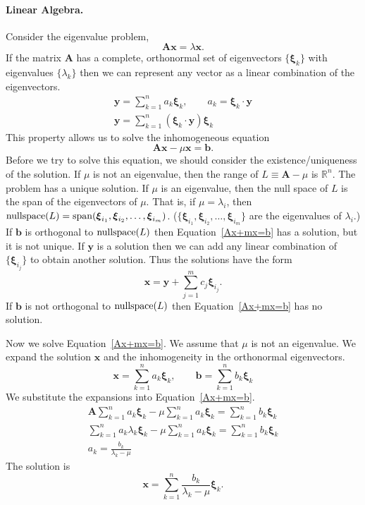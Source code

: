 \paragraph{Linear Algebra.}
Consider the eigenvalue problem,
\[
\mathbf{A} \mathbf{x} = \lambda \mathbf{x}.
\]
If the matrix $\mathbf{A}$ has a complete, orthonormal set of eigenvectors
$\{ \boldsymbol{\xi}_k \}$ with eigenvalues $\{ \lambda_k \}$ then we can
represent any vector as a linear combination of the eigenvectors.
\begin{gather*}
  \mathbf{y} = \sum_{k=1}^n a_k \boldsymbol{\xi}_k, \qquad
  a_k = \boldsymbol{\xi}_k \cdot \mathbf{y} \\
  \mathbf{y} = \sum_{k=1}^n \left(\boldsymbol{\xi}_k \cdot \mathbf{y} \right) \boldsymbol{\xi}_k
\end{gather*}
This property allows us to solve the inhomogeneous equation
\begin{equation}
  \label{Ax+mx=b}
  \mathbf{A} \mathbf{x} - \mu \mathbf{x} = \mathbf{b}.
\end{equation}
Before we try to solve this equation, we should consider the
existence/uniqueness of the solution.  If $\mu$ is not an eigenvalue,
then the range of $L \equiv \mathbf{A} - \mu$ is $\mathbb{R}^n$.  The
problem has a unique solution.  If $\mu$ is an eigenvalue, then the
null space of $L$ is the span of the eigenvectors of $\mu$.
That is, if $\mu = \lambda_i$, then
$\mathop{\mathrm{nullspace}}\nolimits(L) = \mathop{\mathrm{span}}\nolimits(\boldsymbol{\xi}_{i_1}, \boldsymbol{\xi}_{i_2}, \ldots,
\boldsymbol{\xi}_{i_m})$.  ($\{ \boldsymbol{\xi}_{i_1}, \boldsymbol{\xi}_{i_2}, \ldots,
\boldsymbol{\xi}_{i_m} \}$ are the eigenvalues of $\lambda_i$.)
If $\mathbf{b}$ is orthogonal to $\mathop{\mathrm{nullspace}}\nolimits(L)$ then Equation~\ref{Ax+mx=b}
has a solution, but it is not unique.  If $\mathbf{y}$ is a solution then we
can add any linear combination of $\{ \boldsymbol{\xi}_{i_j} \}$
to obtain another solution. Thus the solutions have the form
\[
\mathbf{x} = \mathbf{y} + \sum_{j = 1}^m c_j \boldsymbol{\xi}_{i_j}.
\]
If $\mathbf{b}$ is not orthogonal to $\mathop{\mathrm{nullspace}}\nolimits(L)$ then Equation~\ref{Ax+mx=b}
has no solution.

Now we solve Equation~\ref{Ax+mx=b}.  We assume that $\mu$ is not an
eigenvalue.  We expand the solution $\mathbf{x}$ and the inhomogeneity in the 
orthonormal eigenvectors.
\[
\mathbf{x} = \sum_{k=1}^n a_k \boldsymbol{\xi}_k, \qquad
\mathbf{b} = \sum_{k=1}^n b_k \boldsymbol{\xi}_k
\]
We substitute the expansions into Equation~\ref{Ax+mx=b}.
\begin{gather*}
  \mathbf{A} \sum_{k=1}^n a_k \boldsymbol{\xi}_k - \mu \sum_{k=1}^n a_k \boldsymbol{\xi}_k 
  = \sum_{k=1}^n b_k \boldsymbol{\xi}_k \\
  \sum_{k=1}^n a_k \lambda_k \boldsymbol{\xi}_k - \mu \sum_{k=1}^n a_k \boldsymbol{\xi}_k 
  = \sum_{k=1}^n b_k \boldsymbol{\xi}_k \\
  a_k = \frac{ b_k }{ \lambda_k - \mu }
\end{gather*}
The solution is
\[
\mathbf{x} = \sum_{k=1}^n \frac{ b_k }{ \lambda_k - \mu } \boldsymbol{\xi}_k.
\]






